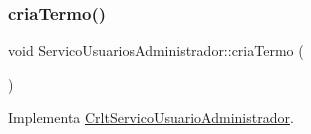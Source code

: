 \mbox{\label{class_servico_usuarios_administrador_a9002054e8a06338e2a380517b6aeb1f7}} 
\subsubsection{\texorpdfstring{cria\+Termo()}{criaTermo()}}
{\footnotesize\ttfamily void Servico\+Usuarios\+Administrador\+::cria\+Termo (\begin{DoxyParamCaption}{ }\end{DoxyParamCaption})\hspace{0.3cm}{\ttfamily [virtual]}}



Implementa \mbox{\hyperlink{class_crlt_servico_usuario_administrador_af7c63b86c3ee31bf1a0ae5edca56515c}{Crlt\+Servico\+Usuario\+Administrador}}.



